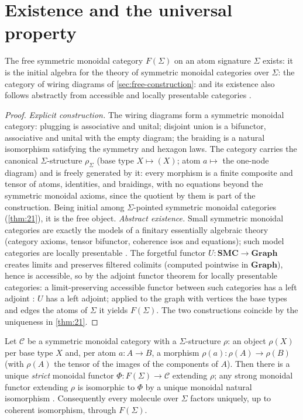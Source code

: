 \section{Existence and the universal property}\label{sec:free-existence}

\begin{theorem}\label{thm:20}
 The free symmetric monoidal category $F (\Sigma)$ on an
atom signature $\Sigma$ exists: it is the initial algebra for the theory of
symmetric monoidal categories over $\Sigma$: the category of wiring
diagrams of \autoref{sec:free-construction}: and its existence also follows
abstractly from accessible and locally presentable categories \cite{adamek}.
\end{theorem}

\begin{proof}
\emph{Explicit construction.} The wiring diagrams form a symmetric monoidal
category: plugging is associative and unital; disjoint union is a bifunctor,
associative and unital with the empty diagram; the braiding is a natural
isomorphism satisfying the symmetry and hexagon laws. The category carries
the canonical $\Sigma$-structure $\rho_\Sigma$ (base type $X \mapsto (X)$;
atom $a \mapsto$ the one-node diagram) and is freely generated by it: every
morphism is a finite composite and tensor of atoms, identities, and braidings,
with no equations beyond the symmetric monoidal axioms, since the quotient by
them is part of the construction. Being initial among $\Sigma$-pointed
symmetric monoidal categories (\autoref{thm:21}), it is the free object.
\emph{Abstract existence.} Small symmetric monoidal categories are exactly
the models of a finitary essentially algebraic theory (category axioms,
tensor bifunctor, coherence isos and equations); such model categories are
locally presentable \cite{adamek}. The forgetful functor
$U \colon \mathbf{SMC} \to \mathbf{Graph}$ creates limits and preserves
filtered colimits (computed pointwise in $\mathbf{Graph}$), hence is
accessible, so by the adjoint functor theorem for locally presentable
categories: a limit-preserving accessible functor between such categories
has a left adjoint \cite{adamek}: $U$ has a left adjoint; applied to the
graph with vertices the base types and edges the atoms of $\Sigma$ it yields
$F (\Sigma)$. The two constructions coincide by the uniqueness in \autoref{thm:21}.
\end{proof}

\begin{theorem}\label{thm:21}
 Let $\mathcal{C}$ be a symmetric monoidal category with a
$\Sigma$-structure $\rho$: an object $\rho (X)$ per base type $X$ and, per
atom $a \colon A \to B$, a morphism $\rho (a) \colon \rho (A) \to \rho (B)$
(with $\rho (A)$ the tensor of the images of the components of $A$). Then
there is a unique \emph{strict} monoidal functor $\Phi \colon F (\Sigma) \to
\mathcal{C}$ extending $\rho$; any strong monoidal functor extending $\rho$
is isomorphic to $\Phi$ by a unique monoidal natural isomorphism
\cite{maclane}. Consequently every molecule over $\Sigma$ factors uniquely,
up to coherent isomorphism, through $F (\Sigma)$.
\end{theorem}

